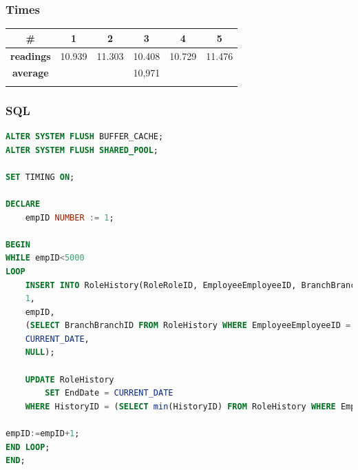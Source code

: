 \documentclass[a4paper, 10pt]{article}
\begin{document}
\subsubsection{Times}
\begin{table}[H]
\centering
\begin{tabular}{cccccc}
\hline
\multicolumn{1}{|c|}{\textbf{\#}}       & \multicolumn{1}{c|}{\textbf{1}} & \multicolumn{1}{c|}{\textbf{2}} & \multicolumn{1}{c|}{\textbf{3}} & \multicolumn{1}{c|}{\textbf{4}} & \multicolumn{1}{c|}{\textbf{5}} \\ \hline
\multicolumn{1}{|c|}{\textbf{readings}} & \multicolumn{1}{c|}{10.939}           & \multicolumn{1}{c|}{11.303}           & \multicolumn{1}{c|}{10.408}           & \multicolumn{1}{c|}{10.729}           & \multicolumn{1}{c|}{11.476}           \\ \hline
\multicolumn{1}{|c|}{\textbf{average}}      & \multicolumn{5}{c|}{10,971}                                                                                                                                                   \\ \hline
\textbf{}                               & \textbf{}                       & \textbf{}                       & \textbf{}                       & \textbf{}                       & \textbf{}                      
\end{tabular}
\end{table}
\subsubsection{SQL}
\begin{lstlisting}[language=SQL]
ALTER SYSTEM FLUSH BUFFER_CACHE;
ALTER SYSTEM FLUSH SHARED_POOL;

SET TIMING ON;

DECLARE 
    empID NUMBER := 1;

BEGIN
WHILE empID<5000
LOOP
    INSERT INTO RoleHistory(RoleRoleID, EmployeeEmployeeID, BranchBranchId, BeginDate, EndDate) VALUES (
    1,
    empID,
    (SELECT BranchBranchID FROM RoleHistory WHERE EmployeeEmployeeID = empID AND EndDate is NULL),
    CURRENT_DATE,
    NULL);

    UPDATE RoleHistory
        SET EndDate = CURRENT_DATE
    WHERE HistoryID = (SELECT min(HistoryID) FROM RoleHistory WHERE EmployeeEmployeeID = empID AND EndDate is NULL);

empID:=empID+1;
END LOOP;
END;
\end{lstlisting}
\end{document}
